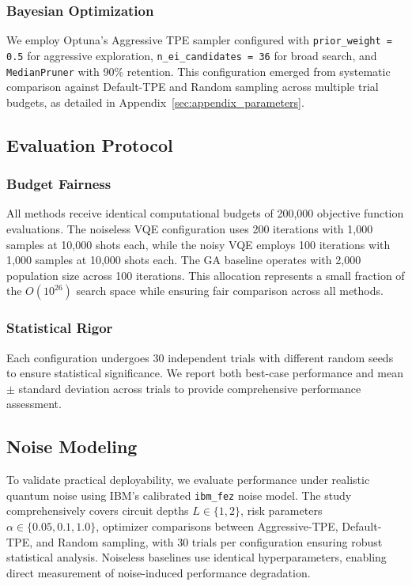 \subsubsection{Bayesian Optimization}
We employ Optuna's Aggressive TPE sampler configured with \texttt{prior\_weight = 0.5} for aggressive exploration, \texttt{n\_ei\_candidates = 36} for broad search, and \texttt{MedianPruner} with 90\% retention. This configuration emerged from systematic comparison against Default-TPE and Random sampling across multiple trial budgets, as detailed in Appendix~\ref{sec:appendix_parameters}.

\subsection{Evaluation Protocol}

\subsubsection{Budget Fairness}
All methods receive identical computational budgets of 200,000 objective function evaluations. The noiseless VQE configuration uses 200 iterations with 1,000 samples at 10,000 shots each, while the noisy VQE employs 100 iterations with 1,000 samples at 10,000 shots each. The GA baseline operates with 2,000 population size across 100 iterations. This allocation represents a small fraction of the $O(10^{26})$ search space while ensuring fair comparison across all methods.

\subsubsection{Statistical Rigor}
Each configuration undergoes 30 independent trials with different random seeds to ensure statistical significance. We report both best-case performance and mean $\pm$ standard deviation across trials to provide comprehensive performance assessment.

\subsection{Noise Modeling}

To validate practical deployability, we evaluate performance under realistic quantum noise using IBM's calibrated \texttt{ibm\_fez} noise model. The study comprehensively covers circuit depths $L \in \{1, 2\}$, risk parameters $\alpha \in \{0.05, 0.1, 1.0\}$, optimizer comparisons between Aggressive-TPE, Default-TPE, and Random sampling, with 30 trials per configuration ensuring robust statistical analysis. Noiseless baselines use identical hyperparameters, enabling direct measurement of noise-induced performance degradation.